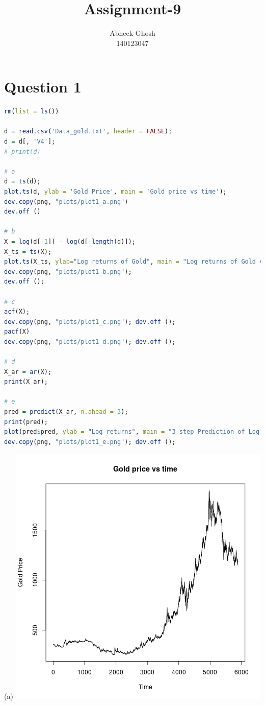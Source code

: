 \documentclass{article}
\begin{document}
	\title{\textbf{Assignment-9}}
	\author{Abheek Ghosh \\ 
		140123047 }
	
	\maketitle
	

\section{Question 1}


\begin{lstlisting}[language=R]
rm(list = ls())

d = read.csv('Data_gold.txt', header = FALSE);
d = d[, 'V4'];
# print(d)

# a
d = ts(d);
plot.ts(d, ylab = 'Gold Price', main = 'Gold price vs time');
dev.copy(png, "plots/plot1_a.png")
dev.off ()

# b
X = log(d[-1]) - log(d[-length(d)]);
X_ts = ts(X);
plot.ts(X_ts, ylab="Log returns of Gold", main = "Log returns of Gold vs Time");
dev.copy(png, "plots/plot1_b.png");
dev.off ();

# c
acf(X);
dev.copy(png, "plots/plot1_c.png"); dev.off ();
pacf(X)
dev.copy(png, "plots/plot1_d.png"); dev.off ();

# d
X_ar = ar(X);
print(X_ar);

# e
pred = predict(X_ar, n.ahead = 3);
print(pred);
plot(pred$pred, ylab = "Log returns", main = "3-step Prediction of Log returns");
dev.copy(png, "plots/plot1_e.png"); dev.off ();
\end{lstlisting}

(a)
\includegraphics{"plot1_a"}
\pagebreak
\end{document}
